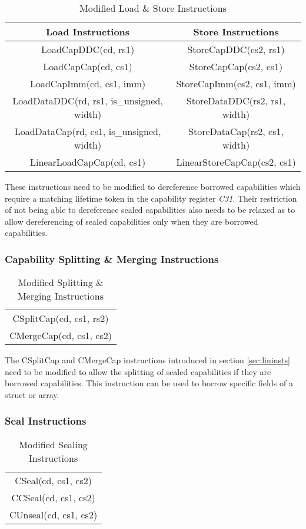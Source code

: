\begin{table}[h]
\centering
\begin{tabular}{| c | c |}
\hline
Load Instructions & Store Instructions \\
\hline
 LoadCapDDC(cd, rs1) & StoreCapDDC(cs2, rs1) \\
 LoadCapCap(cd, cs1) & StoreCapCap(cs2, cs1) \\
 LoadCapImm(cd, cs1, imm) & StoreCapImm(cs2, cs1, imm) \\
 LoadDataDDC(rd, rs1, is\_unsigned, width) & StoreDataDDC(rs2, rs1, width) \\
 LoadDataCap(rd, cs1, is\_unsigned, width) & StoreDataCap(rs2, cs1, width) \\
 LinearLoadCapCap(cd, cs1) & LinearStoreCapCap(cs2, cs1) \\
\hline
\end{tabular}
\caption{Modified Load \& Store Instructions}
\label{table:borrowedderef}
\end{table}

These instructions need to be modified to dereference borrowed capabilities which require a matching lifetime token in the capability register \textit{C31}. Their restriction of not being able to dereference sealed capabilities also needs to be relaxed as to allow dereferencing of sealed capabilities only when they are borrowed capabilities.

\subsubsection{Capability Splitting \& Merging Instructions}
\begin{table}[h]
\centering
\begin{tabular}{| c |}
\hline
 CSplitCap(cd, cs1, rs2) \\
 CMergeCap(cd, cs1, cs2) \\
\hline
\end{tabular}
\caption{Modified Splitting \& Merging Instructions}
\label{table:borrowmodsplit}
\end{table}
The CSplitCap and CMergeCap instructions introduced in section \ref{sec:lininsts} need to be modified to allow the splitting of sealed capabilities if they are borrowed capabilities. This instruction can be used to borrow specific fields of a struct or array.

\subsubsection{Seal Instructions}
\begin{table}[h]
\centering
\begin{tabular}{| c |}
\hline
 CSeal(cd, cs1, cs2) \\
 CCSeal(cd, cs1, cs2) \\
 CUnseal(cd, cs1, cs2) \\
\hline
\end{tabular}
\caption{Modified Sealing Instructions}
\label{table:borrowmodseal}
\end{table}

